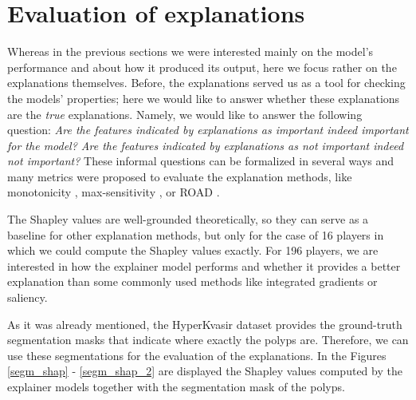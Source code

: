 \documentclass[magisterska,en]{pracamgr}
\begin{document}
\section{Evaluation of explanations}\label{s:evaluation}
Whereas in the previous sections we were interested mainly on the model's performance and about how it produced its output, here we focus rather on the explanations themselves. Before, the explanations served us as a tool for checking the models' properties; here we would like to answer whether these explanations are the \textit{true} explanations. Namely, we would like to answer the following question: \textit{Are the features indicated by explanations as important indeed important for the model? Are the features indicated by explanations as not important indeed not important?} These informal questions can be formalized in several ways and many metrics were proposed to evaluate the explanation methods, like monotonicity \cite{DBLP:journals/corr/abs-2007-07584}, max-sensitivity \cite{DBLP:conf/nips/YehHSIR19},
or ROAD \cite{DBLP:conf/icml/RongLBKK22}.

The Shapley values are well-grounded theoretically, so they can serve as a baseline for other explanation methods, but only for the case of 16 players in which we could compute the Shapley values exactly. For 196 players, we are interested in how the explainer model performs and whether it provides a better explanation than some commonly used methods like integrated gradients or saliency.





As it was already mentioned, the HyperKvasir dataset provides the ground-truth segmentation masks that indicate where exactly the polyps are. Therefore, we can use these segmentations for the evaluation of the explanations. In the Figures \ref{segm_shap} -  \ref{segm_shap_2} are displayed the Shapley values computed by the explainer models together with the segmentation mask of the polyps.
\end{document}
